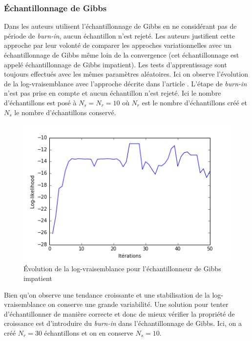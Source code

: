 \documentclass[10pt,a4paper]{article}
\begin{document}
\subsubsection{Échantillonnage de Gibbs}

Dans \cite{ghahramani1997factorial} les auteurs utilisent l'échantillonnage
de Gibbs en ne considérant pas de période de \textit{burn-in}, aucun
échantillon n'est rejeté.
Les auteurs justifient cette approche par leur volonté de comparer les
approches variationnelles avec un échantillonnage de Gibbs même loin de la
convergence (cet échantillonnage est appelé échantillonnage de Gibbs
impatient).
Les tests d'apprentissage sont toujours effectués avec les mêmes paramètres
aléatoires.
Ici on observe l'évolution de la log-vraisemblance avec l'approche décrite dans
l'article \cite{ghahramani1997factorial}.
L'étape de \textit{burn-in} n'est pas prise en compte et aucun échantillon
n'est rejeté.
Ici le nombre d'échantillons est posé à $N_s=N_r=10$ où $N_r$ est le nombre
d'échantillons créé et $N_s$ le nombre d'échantillons conservé.

\begin{figure}[H]
  \centering
  \includegraphics[scale=0.5]{../resources/pictures/M3_K2_gibbsnoburning.png}
  \caption{Évolution de la log-vraisemblance pour l'échantillonneur de Gibbs impatient}
\end{figure}

  Bien qu'on observe une tendance croissante et une stabilisation de la 
log-vraisemblance on conserve une grande variabilité.
Une solution pour tenter d'échantillonner de manière correcte et donc de mieux
vérifier la propriété de croissance est d'introduire du \textit{burn-in} dans
l'échantillonnage de Gibbs.
Ici, on a créé $N_r = 30$ échantillons et on en conserve $N_s = 10$.
\end{document}

